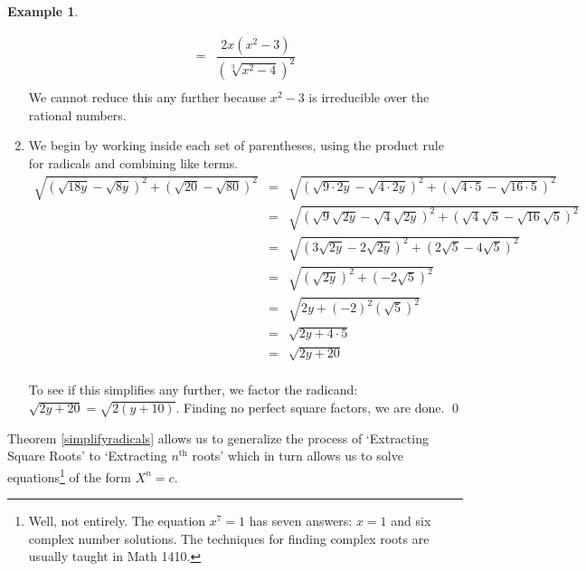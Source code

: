 \documentclass[11pt]{article}
\theoremstyle{definition}  %
\newtheorem{ex}{\bf Example}
\begin{document}
\begin{ex}
\begin{enumerate}
\[\begin{array}{rclr}
& = & \dfrac{2x(x^2-3)}{(\sqrt[3]{x^2-4})^2} & \\

\end{array}\] We cannot reduce this any further because $x^2 - 3$ is irreducible over the rational numbers. 


\item  We begin by working inside each set of parentheses, using the product rule for radicals and combining like terms.\[ \begin{array}{rclr}


 \sqrt{(\sqrt{18y} - \sqrt{8y})^2 + (\sqrt{20} - \sqrt{80})^2} & = & \sqrt{(\sqrt{9\cdot 2y} - \sqrt{4 \cdot 2y})^2 + (\sqrt{4\cdot 5} - \sqrt{16 \cdot 5})^2} & \\[8pt]

& = & \sqrt{(\sqrt{9} \sqrt{2y} - \sqrt{4}\sqrt{2y})^2 + (\sqrt{4}\sqrt{5} - \sqrt{16}\sqrt{5})^2} & \\[8pt]


& = & \sqrt{(3\sqrt{2y} - 2\sqrt{2y})^2 + (2\sqrt{5} - 4\sqrt{5})^2} & \\[8pt]

& = & \sqrt{(\sqrt{2y})^2 + (-2\sqrt{5})^2} & \\[8pt]


& = & \sqrt{2y + (-2)^2(\sqrt{5})^2} & \\[8pt]


& = & \sqrt{2y + 4\cdot 5} & \\[8pt]

& = & \sqrt{2y + 20} & \\ 

\end{array} \]

To see if this simplifies any further, we factor the radicand:  $\sqrt{2y+20} = \sqrt{2(y+10)}$.  Finding no perfect square factors, we are done. \qed

\end{enumerate}


\end{ex}


Theorem \ref{simplifyradicals} allows us to generalize the process of `Extracting Square Roots' to `Extracting $n^{\text{th}}$ roots' which in turn allows us to solve equations\footnote{Well, not entirely.  The equation $x^{7} = 1$ has seven answers: $x = 1$ and six complex number solutions. The techniques for finding complex roots are usually taught in Math 1410.} of the form $X^n  = c$.

\label{extractingnthroots}
\end{document}
